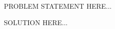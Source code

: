 \documentclass[twoside,11pt,a4paper]{report}
\begin{document}


\begin{hwproblem}

PROBLEM STATEMENT HERE...

\end{hwproblem}
SOLUTION HERE...
\end{document}
